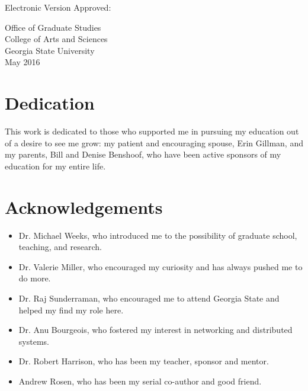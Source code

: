 \documentclass[12pt,letterpaper]{report}
\begin{document}
	
	\noindent
	Electronic Version Approved:\\
	\vspace{1cm}
	
	\noindent
	Office of Graduate Studies \\
	College of Arts and Sciences \\
	Georgia State University\\
	May 2016 
	
	
	
	
	\chapter*{Dedication}
	This work is dedicated to those who supported me in pursuing my education out of a desire to see me grow: my patient and encouraging spouse, Erin Gillman, and my parents, Bill and Denise Benshoof, who have been active sponsors of my education for my entire life.
	\setcounter{page}{4}	
	
	\chapter*{Acknowledgements}	

\begin{itemize}
\item	Dr. Michael Weeks, who introduced me to the possibility of graduate school, teaching, and research.
\item	Dr. Valerie Miller, who encouraged my curiosity and has always pushed me to do more. 
\item	Dr. Raj Sunderraman, who encouraged me to attend Georgia State and helped my find my role here.
\item	Dr. Anu Bourgeois, who fostered my interest in networking and distributed systems.
\item	Dr. Robert Harrison, who has been my teacher, sponsor and mentor.
\item   Andrew Rosen, who has been my serial co-author and good friend.
\end{itemize}
	
	\clearpage

	\setcounter{tocdepth}{0}
	\tableofcontents
	\clearpage



	\setcounter{tocdepth}{1}
	\listoftables
	\clearpage
	\listoffigures
	
	

	\clearpage	
	
	
	
	
	
	
	
	
	
	
	
\end{document}
